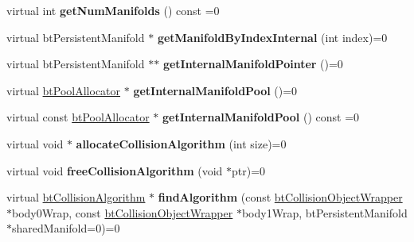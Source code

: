 \begin{DoxyCompactItemize}
\item 
\mbox{\label{classbtDispatcher_a0c94a046ac053c226d43211c5379c31f}} 
virtual int {\bfseries get\+Num\+Manifolds} () const =0
\item 
\mbox{\label{classbtDispatcher_a39b0732750f15f48d2e8faa2de18d4e0}} 
virtual bt\+Persistent\+Manifold $\ast$ {\bfseries get\+Manifold\+By\+Index\+Internal} (int index)=0
\item 
\mbox{\label{classbtDispatcher_a6dc66e497da821c3646e1f89f7d53412}} 
virtual bt\+Persistent\+Manifold $\ast$$\ast$ {\bfseries get\+Internal\+Manifold\+Pointer} ()=0
\item 
\mbox{\label{classbtDispatcher_aa2f5918d1905cd291a10ced30b182c9c}} 
virtual \hyperlink{classbtPoolAllocator}{bt\+Pool\+Allocator} $\ast$ {\bfseries get\+Internal\+Manifold\+Pool} ()=0
\item 
\mbox{\label{classbtDispatcher_a19470efec674c942b691c156dc89df40}} 
virtual const \hyperlink{classbtPoolAllocator}{bt\+Pool\+Allocator} $\ast$ {\bfseries get\+Internal\+Manifold\+Pool} () const =0
\item 
\mbox{\label{classbtDispatcher_a0f0b69ca4c16a66abdabf3575b655e78}} 
virtual void $\ast$ {\bfseries allocate\+Collision\+Algorithm} (int size)=0
\item 
\mbox{\label{classbtDispatcher_a70380f4805e189f34a56fcbf3eab5aaf}} 
virtual void {\bfseries free\+Collision\+Algorithm} (void $\ast$ptr)=0
\item 
\mbox{\label{classbtDispatcher_a9214731648f5b2d5d55192b5bf649cf9}} 
virtual \hyperlink{classbtCollisionAlgorithm}{bt\+Collision\+Algorithm} $\ast$ {\bfseries find\+Algorithm} (const \hyperlink{structbtCollisionObjectWrapper}{bt\+Collision\+Object\+Wrapper} $\ast$body0\+Wrap, const \hyperlink{structbtCollisionObjectWrapper}{bt\+Collision\+Object\+Wrapper} $\ast$body1\+Wrap, bt\+Persistent\+Manifold $\ast$shared\+Manifold=0)=0
\item 
\mbox{\label{classbtDispatcher_a8c7798c84a4ec8da239b70797fa5abf2}} 
$$
\end{DoxyCompactItemize}

